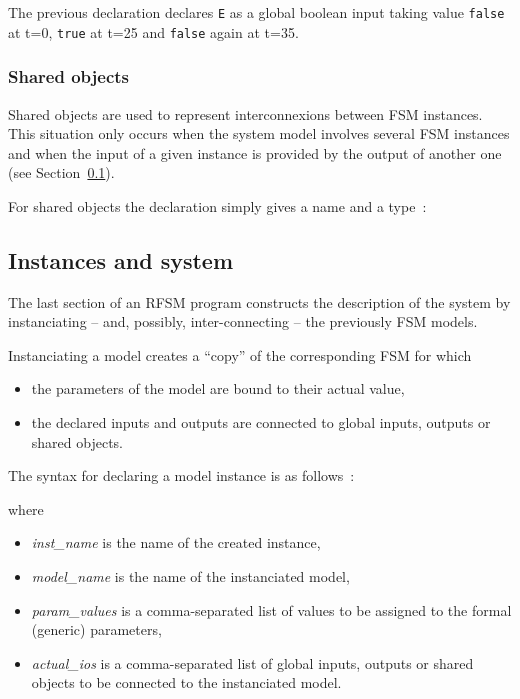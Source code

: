 The previous declaration declares \verb|E| as a global boolean input taking value \texttt{false} at
t=0, \texttt{true} at t=25 and \texttt{false} again at t=35.

\subsubsection*{Shared objects}
\label{sec:shared}

Shared objects are used to represent interconnexions between FSM instances. This situation only
occurs when the system model involves several FSM instances and when the input of a given instance
is provided by the output of another one (see Section~\ref{sec:fsm-instances}).

\step For shared objects the declaration simply gives a name and a type~:

\begin{center}
\end{center}

\subsection{Instances and system}
\label{sec:fsm-instances}

The last section of an RFSM program constructs the description of the system by instanciating
-- and, possibly, inter-connecting -- the previously FSM models.

\medskip
Instanciating a model creates a ``copy'' of the corresponding FSM for which
\begin{itemize}
\item the parameters of the model are bound to their actual value,
\item the declared inputs and outputs are connected to global inputs, outputs or shared
  objects.
\end{itemize}

\medskip
The syntax for declaring a model instance is as follows~:

\begin{center}
\end{center}

where
\begin{itemize}
\item \emph{inst\_name} is the name of the created instance,
\item \emph{model\_name} is the name of the instanciated model,
\item \emph{param\_values} is a comma-separated list of values to be assigned to the formal
  (generic) parameters,
\item \emph{actual\_ios} is a comma-separated list of global inputs, outputs or shared objects to be
  connected to the instanciated model.
\end{itemize}

